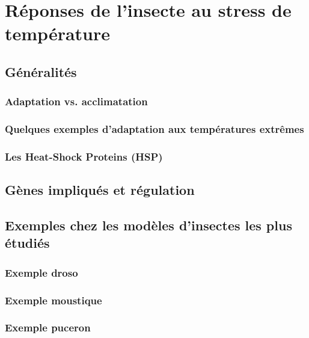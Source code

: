 \chapter{Réponses de l’insecte au stress de température} %
\label{chap:repstress}
	
	\section{Généralités} %
	\label{sec:g_n_ralit_s}
		

		\subsection{Adaptation vs. acclimatation} %
		\label{sub:adaptation_vs_accilmatation}
			

		\subsection{Quelques exemples d'adaptation aux températures extrêmes} %
		\label{sub:exemples_adaptations}
			

		\subsection{Les Heat-Shock Proteins (HSP)} %
		\label{sub:generalites_HSP}
					

	\section{Gènes impliqués et régulation} %
	\label{sec:genes}
		

	\section{Exemples chez les modèles d'insectes les plus étudiés} %
	\label{sec:exemples_modeles}
		

		\subsection{Exemple droso} %
		\label{sub:exemple_droso}
			

		\subsection{Exemple moustique} %
		\label{sub:exemple_moustique}
			

		\subsection{Exemple puceron} %
		\label{sub:exemple_puceron}
			
			
